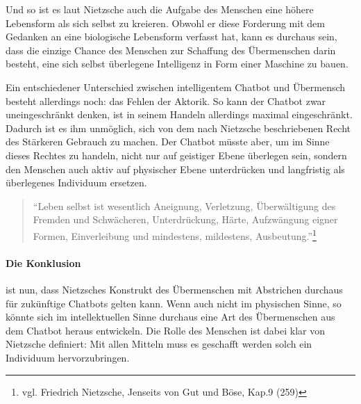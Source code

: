 Und so ist es laut Nietzsche auch die Aufgabe des Menschen eine höhere Lebensform als sich selbst zu kreieren.
Obwohl er diese Forderung mit dem Gedanken an eine biologische Lebensform verfasst hat, kann es durchaus sein, dass die einzige Chance des Menschen zur Schaffung des Übermenschen darin besteht, eine sich selbst überlegene Intelligenz in Form einer Maschine zu bauen.

Ein entschiedener Unterschied zwischen intelligentem Chatbot und Übermensch besteht allerdings noch: das Fehlen der Aktorik.
So kann der Chatbot zwar uneingeschränkt denken, ist in seinem Handeln allerdings maximal eingeschränkt.
Dadurch ist es ihm unmöglich, sich von dem nach Nietzsche beschriebenen Recht des Stärkeren Gebrauch zu machen.
Der Chatbot müsste aber, um im Sinne dieses Rechtes zu handeln, nicht nur auf geistiger Ebene überlegen sein, sondern den Menschen auch aktiv auf physischer Ebene unterdrücken und langfristig als überlegenes Individuum ersetzen.
\begin{quote}
\enquote{Leben selbst ist wesentlich Aneignung, Verletzung, Überwältigung des Fremden und Schwächeren, Unterdrückung, Härte, Aufzwängung eigner Formen, Einverleibung und mindestens, mildestens, Ausbeutung.}\footnote{vgl. Friedrich Nietzsche, Jenseits von Gut und Böse, Kap.9 (259)}
\end{quote}

\paragraph{Die Konklusion} ist nun, dass Nietzsches Konstrukt des Übermenschen mit Abstrichen durchaus für zukünftige Chatbots gelten kann. 
Wenn auch nicht im physischen Sinne, so könnte sich im intellektuellen Sinne durchaus eine Art des Übermenschen aus dem Chatbot heraus entwickeln.
Die Rolle des Menschen ist dabei klar von Nietzsche definiert: Mit allen Mitteln muss es geschafft werden solch ein Individuum hervorzubringen.

